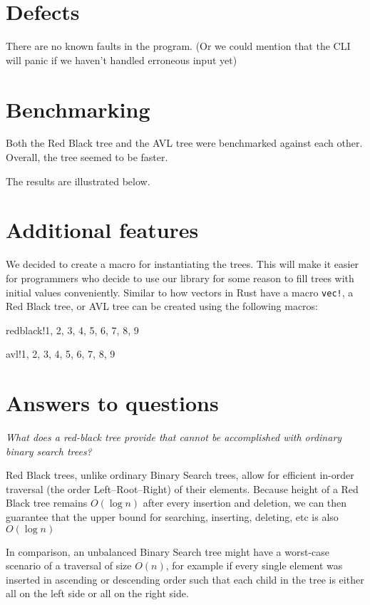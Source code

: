 \documentclass[letterpaper]{article}
\begin{document}
\section{Defects}

There are no known faults in the program.
(Or we could mention that the CLI will panic if we haven't handled erroneous
input yet)

\section{Benchmarking}
Both the Red Black tree and the AVL tree were benchmarked against each other.
Overall, the \todo{} tree seemed to be faster.

The results are illustrated below.

\section{Additional features}
We decided to create a macro for instantiating the trees.  This will make it
easier for programmers who decide to use our library for some reason to fill
trees with initial values conveniently.  Similar to how vectors in Rust have a
macro \texttt{vec!}, a Red Black tree, or AVL tree can be created using the
following macros:

\begin{texttt}
  redblack!{1, 2, 3, 4, 5, 6, 7, 8, 9}
\end{texttt}

\begin{texttt}
  avl!{1, 2, 3, 4, 5, 6, 7, 8, 9}
\end{texttt}

\section{Answers to questions}

\textit{What does a red-black tree provide that cannot be accomplished with
ordinary binary search trees?}

Red Black trees, unlike ordinary Binary Search trees, allow for efficient
in-order traversal (the order Left–Root–Right) of their elements.
Because  height of a Red Black tree remains \(O(\log n)\) after every
insertion and deletion, we can then guarantee that the
upper bound for searching, inserting, deleting, etc is also \(O(\log n)\)

In comparison, an unbalanced Binary Search tree might have a worst-case scenario
of a traversal of size \(O(n)\), for example if every single element was
inserted in ascending or descending order such that each child in the tree is
either all on the left side or all on the right side.
\end{document}
